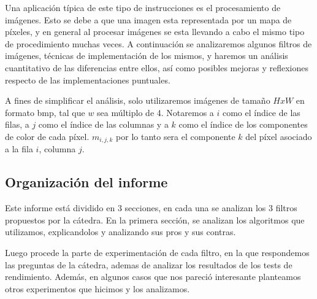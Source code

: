 Una aplicación típica de este tipo de instrucciones es el procesamiento de imágenes. Esto se debe a que una imagen esta representada por un mapa de píxeles, y en general al procesar imágenes se esta llevando a cabo el mismo tipo de procedimiento muchas veces. A continuación se analizaremos algunos filtros de imágenes, técnicas de implementación de los mismos, y haremos un análisis cuantitativo de las diferencias entre ellos, así como posibles mejoras y reflexiones respecto de las implementaciones puntuales.

A fines de simplificar el análisis, solo utilizaremos imágenes de tamaño $HxW$ en formato bmp, tal que $w$ sea múltiplo de 4. Notaremos a $i$ como el índice de las filas, a $j$ como el índice de las columnas y a $k$ como el índice de los componentes de color de cada píxel. $m_{i, j, k}$ por lo tanto sera el componente $k$ del píxel asociado a la fila $i$, columna $j$.


\subsection{Organización del informe}

Este informe está dividido en 3 secciones, en cada una se analizan los 3 filtros propuestos por la cátedra. En la primera sección, se analizan los algoritmos que utilizamos, explicandolos y analizando sus pros y sus contras. 

Luego procede la parte de experimentación de cada filtro, en la que respondemos las preguntas de la cátedra, ademas de analizar los resultados de los tests de rendimiento. Además, en algunos casos que nos pareció interesante planteamos otros experimentos que hicimos y los analizamos.


